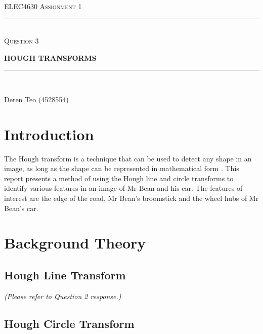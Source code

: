 \begin{titlepage}
  \centering

  \textsc{ELEC4630 Assignment 1}\\
  \vspace{9cm}

  \rule{\linewidth}{0.5pt}\\

  \vspace{1em}
  \LARGE\textsc{Question 3}\\
  \vspace{1em}

  \LARGE\uppercase{\textbf{{Hough Transforms}}}\\

  \rule{\linewidth}{2pt}\\

  \vfill

  \normalsize{Deren Teo (4528554)}
  \vspace{1cm}

\end{titlepage}

\section{Introduction}

The Hough transform is a technique that can be used to detect any shape in an image, as long as the shape can be represented in mathematical form \cite{opencv_hlt}. This report presents a method of using the Hough line and circle transforms to identify various features in an image of Mr Bean and his car. The features of interest are the edge of the road, Mr Bean's broomstick and the wheel hubs of Mr Bean's car.

\section{Background Theory}

\subsection{Hough Line Transform}

\textit{(Please refer to Question 2 response.)}

\subsection{Hough Circle Transform}

